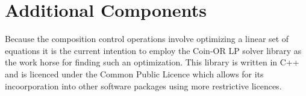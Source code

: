 \documentclass[12pt]{article}
\begin{document}
\section{Additional Components}
Because the composition control operations involve optimizing a linear set
of equations it is the current intention to employ the Coin-OR LP solver
library as the work horse for finding such an optimization. This library
is written in C++ and is licenced under the Common Public Licence which
allows for its incoorporation into other software packages using
more restrictive licences. 
\end{document}
